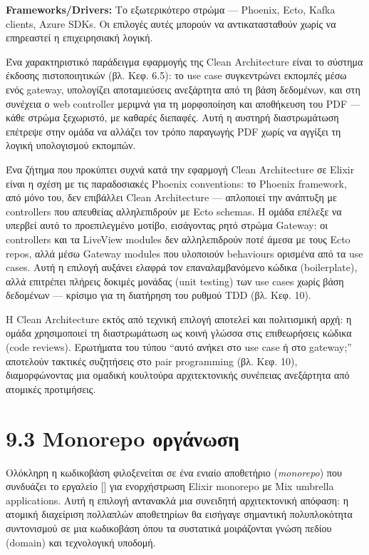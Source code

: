 \documentclass[11pt,a4paper,greek,twoside]{template-xe}
\let\origtexttt\texttt
\renewcommand{\texttt}[1]{%
  \begingroup
  \StrSubstitute{#1}{.}{.\allowbreak}[\tttmp]%
  \origtexttt{\tttmp}%
  \endgroup
}
\begin{document}
\textbf{Frameworks/Drivers:} Το εξωτερικότερο στρώμα --- Phoenix, Ecto,
Kafka clients, Azure SDKs. Οι επιλογές αυτές μπορούν να αντικατασταθούν
χωρίς να επηρεαστεί η επιχειρησιακή λογική.

Ένα χαρακτηριστικό παράδειγμα εφαρμογής της Clean Architecture είναι το
σύστημα έκδοσης πιστοποιητικών (βλ. Κεφ. 6.5): το use case συγκεντρώνει
εκπομπές μέσω ενός gateway, υπολογίζει αποταμιεύσεις ανεξάρτητα από τη
βάση δεδομένων, και στη συνέχεια ο web controller μεριμνά για τη
μορφοποίηση και αποθήκευση του PDF --- κάθε στρώμα ξεχωριστό, με καθαρές
διεπαφές. Αυτή η αυστηρή διαστρωμάτωση επέτρεψε στην ομάδα να αλλάζει
τον τρόπο παραγωγής PDF χωρίς να αγγίξει τη λογική υπολογισμού εκπομπών.

Ένα ζήτημα που προκύπτει συχνά κατά την εφαρμογή Clean Architecture σε
Elixir είναι η σχέση με τις παραδοσιακές Phoenix conventions: το Phoenix
framework, από μόνο του, δεν επιβάλλει Clean Architecture --- απλοποιεί
την ανάπτυξη με controllers που απευθείας αλληλεπιδρούν με Ecto schemas.
Η ομάδα επέλεξε να υπερβεί αυτό το προεπιλεγμένο μοτίβο, εισάγοντας ρητό
στρώμα Gateway: οι controllers και τα LiveView modules δεν αλληλεπιδρούν
ποτέ άμεσα με τους Ecto repos, αλλά μέσω Gateway modules που υλοποιούν
behaviours ορισμένα από τα use cases. Αυτή η επιλογή αυξάνει ελαφρά τον
επαναλαμβανόμενο κώδικα (boilerplate), αλλά επιτρέπει πλήρεις δοκιμές
μονάδας (unit testing) των use cases χωρίς βάση δεδομένων --- κρίσιμο
για τη διατήρηση του ρυθμού TDD (βλ. Κεφ. 10).

Η Clean Architecture εκτός από τεχνική επιλογή αποτελεί και πολιτισμική
αρχή: η ομάδα χρησιμοποιεί τη διαστρωμάτωση ως κοινή γλώσσα στις
επιθεωρήσεις κώδικα (code reviews). Ερωτήματα του τύπου ``αυτό ανήκει
στο use case ή στο gateway;'' αποτελούν τακτικές συζητήσεις στο pair
programming (βλ. Κεφ. 10), διαμορφώνοντας μια ομαδική κουλτούρα
αρχιτεκτονικής συνέπειας ανεξάρτητα από ατομικές προτιμήσεις.

\section{9.3 Monorepo
οργάνωση}\label{monorepo-ux3bfux3c1ux3b3ux3acux3bdux3c9ux3c3ux3b7}

Ολόκληρη η κωδικοβάση φιλοξενείται σε ένα ενιαίο αποθετήριο
(\emph{monorepo}) που συνδυάζει το εργαλείο \texttt{Workspace} για
ενορχήστρωση Elixir monorepo με Mix umbrella applications. Αυτή η
επιλογή αντανακλά μια συνειδητή αρχιτεκτονική απόφαση: η ατομική
διαχείριση πολλαπλών αποθετηρίων θα εισήγαγε σημαντική πολυπλοκότητα
συντονισμού σε μια κωδικοβάση όπου τα συστατικά μοιράζονται γνώση πεδίου
(domain) και τεχνολογική υποδομή.
\end{document}
